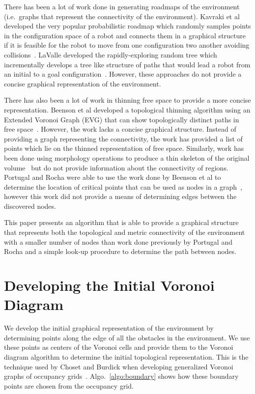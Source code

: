 \documentclass[letterpaper, 10pt, conference]{ieeeconf}
\begin{document}
There has been a lot of work done in generating roadmaps of the environment
(i.e.\ graphs that represent the connectivity of the environment). Kavraki et
al developed the very popular probabilistic roadmap which randomly samples
points in the configuration space of a robot and connects them in a graphical
structure if it is feasible for the robot to move from one configuration two
another avoiding collisions~\cite{prm}. LaValle developed the rapidly-exploring
random tree which incrementally develops a tree like structure of paths that
would lead a robot from an initial to a goal configuration~\cite{rrt}. However,
these approaches do not provide a concise graphical representation of the
environment.

There has also been a lot of work in thinning free space to provide a more
concise representation. Beenson et al developed a topological thinning
algorithm using an Extended Voronoi Graph (EVG) that can show topologically
distinct paths in free space~\cite{evg}. However, the work lacks a concise
graphical structure.  Instead of providing a graph representing the
connectivity, the work has provided a list of points which lie on the thinned
representation of free space. Similarly, work has been done using morphology
operations to produce a thin skeleton of the original
volume~\cite{graphicsGems,skeletonize3d} but do not provide information about
the connectivity of regions. Portugal and Rocha were able to use the work done
by Beenson et al to determine the location of critical points that can be used
as nodes in a graph~\cite{david}, however this work did not provide a means of
determining edges between the discovered nodes.

This paper presents an algorithm that is able to provide a graphical structure
that represents both the topological and metric connectivity of the environment
with a smaller number of nodes than work done previously by Portugal and Rocha
and a simple look-up procedure to determine the path between nodes.

\section{Developing the Initial Voronoi Diagram}

We develop the initial graphical representation of the environment by
determining points along the edge of all the obstacles in the environment. We
use these points as centers of the Voronoi cells and provide them to the
Voronoi diagram algorithm to determine the initial topological representation.
This is the technique used by Choset and Burdick when developing generalized
Voronoi graphs of occupancy grids~\cite{choset2000sensor}.
Algo.~\ref{algo:boundary} shows how these boundary points are chosen from the
occupancy grid.
\end{document}
